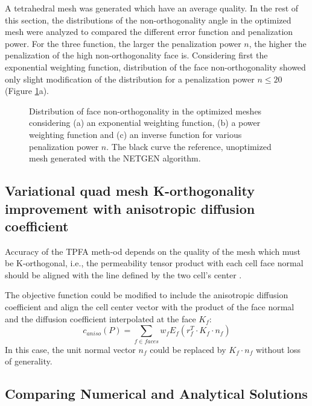 \documentclass[11pt]{article}
\begin{document}
A tetrahedral mesh was generated which have an average quality.
In the rest of this section, the distributions of the non-orthogonality angle in the optimized mesh were analyzed to compared the different error function and penalization power.
For the three function, the larger the penalization power $n$, the higher the penalization of the high non-orthogonality face is.
Considering first the exponential weighting function, distribution of the face non-orthogonality showed only slight modification of the distribution for a penalization power $n \leq 20$ (Figure \ref{orthogonality_distribution}a).

\begin{figure}[h!]
  \centering
  \label{orthogonality_distribution}
  \caption{Distribution of face non-orthogonality in the optimized meshes considering (a) an exponential weighting function, (b) a power weighting function and (c) an inverse function for various penalization power $n$. The black curve the reference, unoptimized mesh generated with the NETGEN algorithm.}
\end{figure}

\subsection{Variational quad mesh K-orthogonality improvement with anisotropic diffusion coefficient}

Accuracy of the TPFA meth-od depends on the quality of the mesh which must be K-orthogonal, i.e., the permeability tensor product with each cell face normal should be aligned with the line defined by the two cell's center \cite{heinemann_modelling_1991}.

The objective function could be modified to include the anisotropic diffusion coefficient and align the cell center vector with the product of the face normal and the diffusion coefficient interpolated at the face $K_f$:
\begin{equation}
c_{aniso}(P) = \sum_{f \in faces} w_f E_f \left( r_f^T \cdot K_f \cdot n_f \right)
\end{equation}
In this case, the unit normal vector $n_f$ could be replaced by $K_f \cdot n_f$ without loss of generality.

\subsection{Comparing Numerical and Analytical Solutions}
\end{document}
